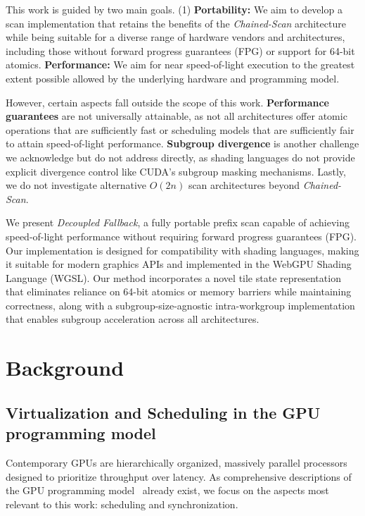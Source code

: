 \documentclass[sigconf]{acmart}
\begin{document}
This work is guided by two main goals. (1) \textbf{Portability:} We aim to develop a scan implementation that retains the benefits of the \emph{Chained-Scan} architecture while being suitable for a diverse range of hardware vendors and architectures, including those without forward progress guarantees (FPG) or support for 64-bit atomics. \textbf{Performance:} We aim for near speed-of-light execution to the greatest extent possible allowed by the underlying hardware and programming model.

However, certain aspects fall outside the scope of this work. \textbf{Performance guarantees} are not universally attainable, as not all architectures offer atomic operations that are sufficiently fast or scheduling models that are sufficiently fair to attain speed-of-light performance. \textbf{Subgroup divergence} is another challenge we acknowledge but do not address directly, as shading languages do not provide explicit divergence control like CUDA’s subgroup masking mechanisms. Lastly, we do not investigate alternative $O(2n)$ scan architectures beyond \emph{Chained-Scan}.

We present \emph{Decoupled Fallback}, a fully portable prefix scan capable of achieving speed-of-light performance without requiring forward progress guarantees (FPG). Our implementation is designed for compatibility with shading languages, making it suitable for modern graphics APIs and implemented in the WebGPU Shading Language (WGSL). Our method incorporates a novel tile state representation that eliminates reliance on 64-bit atomics or memory barriers while maintaining correctness, along with a subgroup-size-agnostic intra-workgroup implementation that enables subgroup acceleration across all architectures.

\section{Background}
\subsection{Virtualization and Scheduling in the GPU programming model}
Contemporary GPUs are hierarchically organized, massively parallel processors designed to prioritize throughput over latency. As comprehensive descriptions of the GPU programming model~\cite{10.1145/1365490.1365500} already exist, we focus on the aspects most relevant to this work: scheduling and synchronization.
\end{document}
